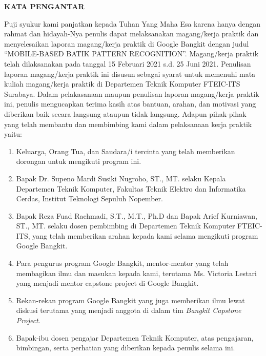 \begin{center}
  \Large\textbf{KATA PENGANTAR}
\end{center}
\vspace{2ex}


Puji syukur kami panjatkan kepada Tuhan Yang Maha Esa karena hanya dengan rahmat dan hidayah-Nya penulis dapat melaksanakan magang/kerja praktik dan menyelesaikan laporan magang/kerja praktik di Google Bangkit dengan judul “MOBILE-BASED BATIK PATTERN RECOGNITION”.
Magang/kerja praktik telah dilaksanakan pada tanggal 15 Februari 2021 s.d. 25 Juni 2021.
Penulisan laporan magang/kerja praktik ini disusun sebagai syarat untuk memenuhi mata kuliah magang/kerja praktik di Departemen Teknik Komputer FTEIC-ITS Surabaya.
Dalam pelakasanaan maupun penulisan laporan magang/kerja praktik ini, penulis mengucapkan terima kasih atas bantuan, arahan, dan motivasi yang diberikan baik secara langsung ataupun tidak langsung.
Adapun pihak-pihak yang telah membantu dan membimbing kami dalam pelaksanaan kerja praktik yaitu:

\begin{enumerate}[nolistsep]

  \item Keluarga, Orang Tua, dan Saudara/i tercinta yang telah memberikan dorongan untuk mengikuti program ini.

  \item Bapak Dr. Supeno Mardi Susiki Nugroho, ST., MT. selaku Kepala Departemen Teknik Komputer, Fakultas Teknik Elektro dan Informatika Cerdas, Institut Teknologi Sepuluh Nopember.

  \item Bapak Reza Fuad Rachmadi, S.T., M.T., Ph.D dan Bapak Arief Kurniawan, ST., MT. selaku dosen pembimbing di Departemen Teknik Komputer FTEIC-ITS, yang telah memberikan arahan kepada kami selama mengikuti program Google Bangkit.

  \item Para pengurus program Google Bangkit, mentor-mentor yang telah membagikan ilmu dan masukan kepada kami, terutama Ms. Victoria Lestari yang menjadi mentor capstone project di Google Bangkit.

  \item Rekan-rekan program Google Bangkit yang juga memberikan ilmu lewat diskusi terutama yang menjadi anggota di dalam tim \textit{Bangkit Capstone Project}.

  \item Bapak-ibu dosen pengajar Departemen Teknik Komputer, atas pengajaran, bimbingan, serta perhatian yang diberikan kepada penulis selama ini.

\end{enumerate}

